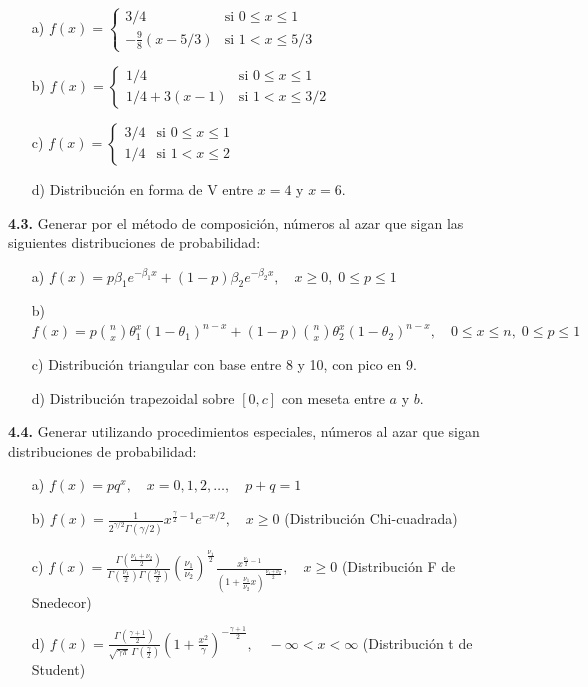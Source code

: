 \documentclass[11pt,letterpaper]{report}
\begin{document}
\begin{enumerate}
    \item[a)] $f(x) = \begin{cases} 3/4 & \text{si } 0 \le x \le 1 \\ -\frac{9}{8}(x - 5/3) & \text{si } 1 < x \le 5/3 \end{cases}$
    \item[b)] $f(x) = \begin{cases} 1/4 & \text{si } 0 \le x \le 1 \\ 1/4 + 3(x - 1) & \text{si } 1 < x \le 3/2 \end{cases}$
    \item[c)] $f(x) = \begin{cases} 3/4 & \text{si } 0 \le x \le 1 \\ 1/4 & \text{si } 1 < x \le 2 \end{cases}$
    \item[d)] Distribución en forma de V entre $x = 4$ y $x = 6$.
\end{enumerate}

\textbf{4.3.} Generar por el método de composición, números al azar que sigan las siguientes distribuciones de probabilidad:

\begin{enumerate}
    \item[a)] $f(x) = p \beta_1 e^{-\beta_1 x} + (1 - p) \beta_2 e^{-\beta_2 x}, \quad x \ge 0, \; 0 \le p \le 1$
    \item[b)] $f(x) = p \binom{n}{x} \theta_1^x (1 - \theta_1)^{n-x} + (1 - p) \binom{n}{x} \theta_2^x (1 - \theta_2)^{n-x}, \quad 0 \le x \le n, \; 0 \le p \le 1$
    \item[c)] Distribución triangular con base entre 8 y 10, con pico en 9.
    \item[d)] Distribución trapezoidal sobre $[0, c]$ con meseta entre $a$ y $b$.
\end{enumerate}

\textbf{4.4.} Generar utilizando procedimientos especiales, números al azar que sigan distribuciones de probabilidad:

\begin{enumerate}
    \item[a)] $f(x) = p q^x, \quad x = 0, 1, 2, \dots, \quad p + q = 1$
    \item[b)] $f(x) = \frac{1}{2^{\gamma/2} \Gamma(\gamma/2)} x^{\frac{\gamma}{2} - 1} e^{-x/2}, \quad x \ge 0$ \quad (Distribución Chi-cuadrada)
    \item[c)] $f(x) = \frac{\Gamma\left(\frac{\nu_1 + \nu_2}{2}\right)}{\Gamma\left(\frac{\nu_1}{2}\right)\Gamma\left(\frac{\nu_2}{2}\right)} \left(\frac{\nu_1}{\nu_2}\right)^{\frac{\nu_1}{2}} \frac{x^{\frac{\nu_1}{2} - 1}}{\left(1 + \frac{\nu_1}{\nu_2} x\right)^{\frac{\nu_1 + \nu_2}{2}}}, \quad x \ge 0$ \quad (Distribución F de Snedecor)
    \item[d)] $f(x) = \frac{\Gamma\left(\frac{\gamma + 1}{2}\right)}{\sqrt{\gamma \pi} \, \Gamma\left(\frac{\gamma}{2}\right)} \left(1 + \frac{x^2}{\gamma}\right)^{-\frac{\gamma + 1}{2}}, \quad -\infty < x < \infty$ \quad (Distribución t de Student)
\end{enumerate}
\end{document}
